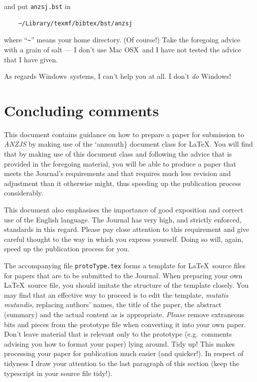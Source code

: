 \documentclass[
  times,
  doublespace]{anzsauth}
\begin{document}
and put \texttt{anzsj.bst} in

\begin{verbatim}
    ~/Library/texmf/bibtex/bst/anzsj
\end{verbatim}

where ``\texttt{\textasciitilde{}}'' means your home directory. (Of
course!) Take the foregoing advice with a grain of salt --- I don't use
Mac OSX\texttrademark~and I have not tested the advice that I have
given.

As regards Windows\texttrademark~systems, I can't help you at all. I
don't \emph{do} Windows\texttrademark!

\section{Concluding comments}\label{sec-concComm}

This document contains guidance on how to prepare a paper for submission
to \emph{ANZJS} by making use of the `anzsauth\} document class for
\LaTeX. You will find that by making use of this document class and
following the advice that is provided in the foregoing material, you
will be able to produce a paper that meets the Journal's requirements
and that requires much less revision and adjustment than it otherwise
might, thus speeding up the publication process considerably.

This document also emphasises the importance of good exposition and
correct use of the English language. The Journal has very high, and
strictly enforced, standards in this regard. Please pay close attention
to this requirement and give careful thought to the way in which you
express yourself. Doing so will, again, speed up the publication process
for you.

The accompanying file \texttt{protoType.tex} forms a template for
\LaTeX~source files for papers that are to be submitted to the Journal.
When preparing your own \LaTeX~source file, you should imitate the
structure of the template closely. You may find that an effective way to
proceed is to edit the template, \emph{mutatis mutandis}, replacing
authors' names, the title of the paper, the abstract (summary) and the
actual content as is appropriate. \emph{Please} remove extraneous bits
and pieces from the prototype file when converting it into your own
paper. Don't leave material that is relevant only to the prototype
(e.g.~comments advising you how to format your paper) lying around. Tidy
up! This makes processing your paper for publication much easier (and
quicker!). In respect of tidyness I draw your attention to the last
paragraph of this section (keep the typescript in your source file
tidy!).
\end{document}
